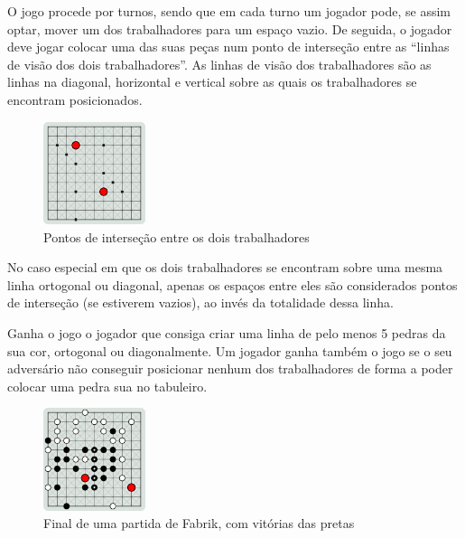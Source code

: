 \documentclass[a4paper]{article}
\begin{document}
O jogo procede por turnos, sendo que em cada turno um jogador pode, se assim optar, mover um dos trabalhadores para um espaço vazio. De seguida, o jogador deve jogar colocar uma das suas peças num ponto de interseção entre as “linhas de visão dos dois trabalhadores”. As linhas de visão dos trabalhadores são as linhas na diagonal, horizontal e vertical sobre as quais os trabalhadores se encontram posicionados.

\begin{figure}[h!]
\begin{center}
\includegraphics[height=3cm,width=3cm]{images/fabrik_intersection.png}
\caption{Pontos de interseção entre os dois trabalhadores}
\label{Figura 2}
\end{center}
\end{figure}

No caso especial em que os dois trabalhadores se encontram sobre uma mesma linha ortogonal ou diagonal, apenas os espaços entre eles são considerados pontos de interseção (se estiverem vazios), ao invés da totalidade dessa linha.

Ganha o jogo o jogador que consiga criar uma linha de pelo menos 5 pedras da sua cor, ortogonal ou diagonalmente. Um jogador ganha também o jogo se o seu adversário não conseguir posicionar nenhum dos trabalhadores de forma a poder colocar uma pedra sua no tabuleiro.

\begin{figure}[h!]
\begin{center}
\includegraphics[height=3cm,width=3cm]{images/fabrik_full_board.png}
\caption{Final de uma partida de Fabrik, com vitórias das pretas}
\label{Figura 3}
\end{center}
\end{figure}


\newpage

\end{document}
